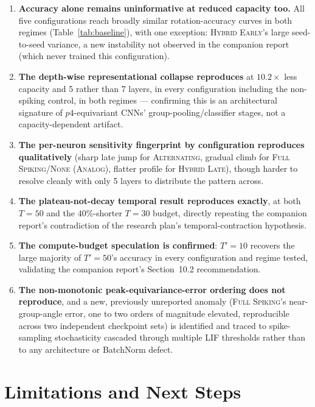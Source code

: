 \documentclass[11pt]{article}
\newcommand{\None}{\textsc{None (Analog)}}
\newcommand{\Alternating}{\textsc{Alternating}}
\newcommand{\FullSpiking}{\textsc{Full Spiking}}
\newcommand{\HybridLate}{\textsc{Hybrid Late}}
\newcommand{\HybridEarly}{\textsc{Hybrid Early}}
\begin{document}
\begin{enumerate}[leftmargin=1.5em]
\item \textbf{Accuracy alone remains uninformative at reduced capacity too.} All five configurations
reach broadly similar rotation-accuracy curves in both regimes (Table~\ref{tab:baseline}), with one
exception: \HybridEarly's large seed-to-seed variance, a new instability not observed in the
companion report (which never trained this configuration).
\item \textbf{The depth-wise representational collapse reproduces} at $10.2\times$ less capacity and
5 rather than 7 layers, in every configuration including the non-spiking control, in both regimes ---
confirming this is an architectural signature of $p4$-equivariant CNNs' group-pooling/classifier
stages, not a capacity-dependent artifact.
\item \textbf{The per-neuron sensitivity fingerprint by configuration reproduces qualitatively}
(sharp late jump for \Alternating, gradual climb for \FullSpiking/\None, flatter profile for
\HybridLate), though harder to resolve cleanly with only 5 layers to distribute the pattern across.
\item \textbf{The plateau-not-decay temporal result reproduces exactly}, at both $T=50$ and the
$40\%$-shorter $T=30$ budget, directly repeating the companion report's contradiction of the research
plan's temporal-contraction hypothesis.
\item \textbf{The compute-budget speculation is confirmed}: $T'=10$ recovers the large majority of
$T'=50$'s accuracy in every configuration and regime tested, validating the companion report's
Section~10.2 recommendation.
\item \textbf{The non-monotonic peak-equivariance-error ordering does not reproduce}, and a new,
previously unreported anomaly (\FullSpiking's near-group-angle error, one to two orders of magnitude
elevated, reproducible across two independent checkpoint sets) is identified and traced to
spike-sampling stochasticity cascaded through multiple LIF thresholds rather than to any architecture
or BatchNorm defect.
\end{enumerate}

\section{Limitations and Next Steps}
\label{sec:limitations}
\end{document}

